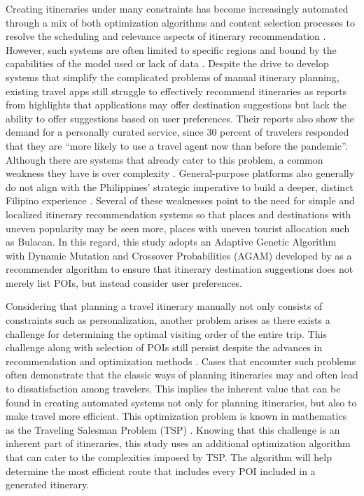 Creating itineraries under many constraints has become increasingly automated through a mix of both optimization algorithms and content selection processes to resolve the scheduling and relevance aspects of itinerary recommendation \parencite{Jewpanya2025,Liu2024}. However, such systems are often limited to specific regions and bound by the capabilities of the model used or lack of data \parencite{Cui2025,papadakis2024,Yulfihani2024}. Despite the drive to develop systems that simplify the complicated problems of manual itinerary planning, existing travel apps still struggle to effectively recommend itineraries as reports from \textcite{SkiftState2022} highlights that applications may offer destination suggestions but lack the ability to offer suggestions based on user preferences. Their reports also show the demand for a personally curated service, since 30 percent of travelers responded that they are “more likely to use a travel agent now than before the pandemic”. Although there are systems that already cater to this problem, a common weakness they have is over complexity \parencite{Postnikova2024}. General-purpose platforms also generally do not align with the Philippines’ strategic imperative to build a deeper, distinct Filipino experience \parencite{SkiftState2022,DOT2023}. Several of these weaknesses point to the need for simple and localized itinerary recommendation systems so that places and destinations with uneven popularity may be seen more, places with uneven tourist allocation such as Bulacan. In this regard, this study adopts an Adaptive Genetic Algorithm with Dynamic Mutation and Crossover Probabilities (AGAM)
developed by \parencite{Yochum2020} as a recommender algorithm to ensure that itinerary destination suggestions does not merely list POIs, but instead consider user preferences.

Considering that planning a travel itinerary manually not only consists of constraints such as personalization, another problem arises as there exists a challenge for determining the optimal visiting order of the entire trip. This challenge along with selection of POIs still persist despite the advances in recommendation and optimization methods \parencite{papadakis2024, Porras2022, Yulfihani2024}. Cases that encounter such problems often demonstrate that the classic ways of planning itineraries may and often lead to dissatisfaction among travelers. This implies the inherent value that can be found in creating automated systems not only for planning itineraries, but also to make travel more efficient. This optimization problem is known in mathematics as the Traveling Salesman Problem (TSP) \parencite{Wu2020}. Knowing that this challenge is an inherent part of itineraries, this study uses an additional optimization algorithm that can cater to the complexities imposed by TSP. The algorithm will help determine the most efficient route that includes every POI included in a generated itinerary.


